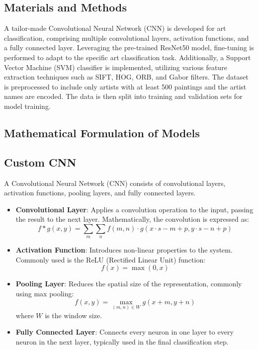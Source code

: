 \documentclass[a0,portrait]{a0poster}
\begin{document}
\begin{multicols}{2}

\section*{Materials and Methods}

A tailor-made Convolutional Neural Network (CNN) is developed for art classification, comprising multiple convolutional layers, activation functions, and a fully connected layer. Leveraging the pre-trained ResNet50 model, fine-tuning is performed to adapt to the specific art classification task. Additionally, a Support Vector Machine (SVM) classifier is implemented, utilizing various feature extraction techniques such as SIFT, HOG, ORB, and Gabor filters. The dataset is preprocessed to include only artists with at least 500 paintings and the artist names are encoded. The data is then split into training and validation sets for model training.


\subsection*{Mathematical Formulation of Models}

\subsection*{Custom CNN}
A Convolutional Neural Network (CNN) consists of convolutional layers, activation functions, pooling layers, and fully connected layers.

\begin{itemize}
\item \textbf{Convolutional Layer}: Applies a convolution operation to the input, passing the result to the next layer. Mathematically, the convolution is expressed as:
  \[
f * g(x, y) = \sum_m \sum_n f(m, n) \cdot g(x \cdot s - m + p, y \cdot s - n + p)
\]
\item \textbf{Activation Function}: Introduces non-linear properties to the system. Commonly used is the ReLU (Rectified Linear Unit) function:
  \[
f(x) = \max(0, x)
\]

\item \textbf{Pooling Layer}: Reduces the spatial size of the representation, commonly using max pooling:
  \[
f(x, y) = \max_{(m, n) \in W} g(x + m, y + n)
\]
  where \( W \) is the window size.
\item \textbf{Fully Connected Layer}: Connects every neuron in one layer to every neuron in the next layer, typically used in the final classification step.
\end{itemize}


\end{multicols}
\end{document}
